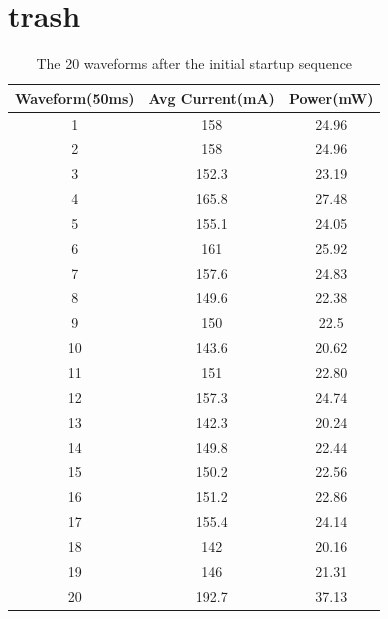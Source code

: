 \section{trash}
\begin{table}[h!]
\begin{center}
 \begin{tabular}{||c c c||} 
 \hline
 Waveform(50ms) & Avg Current(mA) & Power(mW)\\ [0.5ex] 
 \hline\hline
 1 & 158    & 24.96 \\ 
 \hline
 2 & 158    & 24.96 \\
 \hline
 3 & 152.3  & 23.19 \\
 \hline
 4 & 165.8  & 27.48 \\
 \hline
 \rowcolor{red}
 5 & 155.1  & 24.05 \\ 
 \hline
 6 & 161    & 25.92 \\ 
 \hline
 7 & 157.6  & 24.83 \\
 \hline
 8 & 149.6  & 22.38 \\
 \hline
 9 & 150    & 22.5  \\
 \hline
 10 & 143.6 & 20.62 \\ 
 \hline
 11 & 151   & 22.80 \\
  \hline
 12 & 157.3 & 24.74 \\
 \hline
 13 & 142.3 & 20.24 \\ 
 \hline
 14 & 149.8 & 22.44 \\ 
 \hline
 15 & 150.2 & 22.56 \\
 \hline
 16 & 151.2 & 22.86 \\
 \hline
 17 & 155.4 & 24.14 \\
 \hline
 18 & 142   & 20.16 \\ 
 \hline
 19 & 146   & 21.31  \\
 \hline
 \rowcolor{red}
 20 & 192.7 & 37.13 \\[1ex]
\end{tabular}
\end{center}
\caption{The 20 waveforms after the initial startup sequence}
\label{Table:WIFI_ON}
\end{table}

